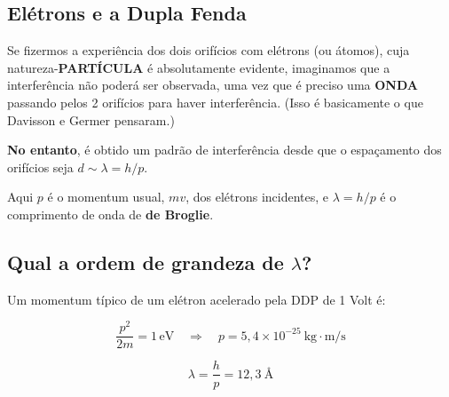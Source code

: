 \subsection*{Elétrons e a Dupla Fenda}

Se fizermos a experiência dos dois orifícios com elétrons (ou átomos), cuja natureza-\textbf{PARTÍCULA} é absolutamente evidente, imaginamos que a interferência não poderá ser observada, uma vez que é preciso uma \textbf{ONDA} passando pelos 2 orifícios para haver interferência. (Isso é basicamente o que Davisson e Germer pensaram.)

\textbf{No entanto}, é obtido um padrão de interferência desde que o espaçamento dos orifícios seja $d \sim \lambda = h/p$.

Aqui $p$ é o momentum usual, $mv$, dos elétrons incidentes, e $\lambda = h/p$ é o comprimento de onda de \textbf{de Broglie}.

\subsection*{Qual a ordem de grandeza de $\lambda$?}

Um momentum típico de um elétron acelerado pela DDP de 1 Volt é:

\begin{center}
\end{center}

\begin{equation}
    \frac{p^2}{2m} = 1\,\text{eV} \quad \Longrightarrow \quad p = 5{,}4\times10^{-25}\ \text{kg}\cdot\text{m/s}
\label{eq:aula10_p_eletron_1V}
\end{equation}

\begin{equation}
    \lambda = \frac{h}{p} = 12{,}3\ \text{\AA}
\label{eq:aula10_lambda_debroglie_eletron}
\end{equation}

